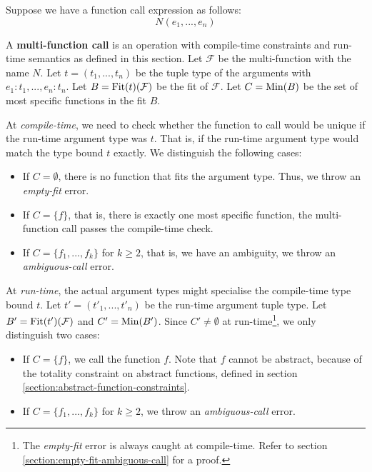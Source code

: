 \begin{definition}
	Suppose we have a function call expression as follows:
	\begin{equation*}
		N(e_1, ..., e_n)
	\end{equation*}
	
	\noindent A \textbf{multi-function call} is an operation with compile-time constraints and run-time semantics as defined in this section. Let $\mathcal{F}$ be the multi-function with the name $N$. Let $t = (t_1, ..., t_n)$ be the tuple type of the arguments with $e_1 : t_1, ..., e_n : t_n$. Let $B = \operatorname{Fit}(t)(\mathcal{F})$ be the fit of $\mathcal{F}$. Let $C = \operatorname{Min}(B)$ be the set of most specific functions in the fit $B$. 
	
	At \textit{compile-time}, we need to check whether the function to call would be unique if the run-time argument type was $t$. That is, if the run-time argument type would match the type bound $t$ exactly. We distinguish the following cases:
	\begin{itemize}
		\item If $C = \emptyset$, there is no function that fits the argument type. Thus, we throw an \textit{empty-fit} error.
		\item If $C = \{ f \}$, that is, there is exactly one most specific function, the multi-function call passes the compile-time check.
		\item If $C = \{ f_1, ..., f_k \}$ for $k \geq 2$, that is, we have an ambiguity, we throw an \textit{ambiguous-call} error.
	\end{itemize}
	
	\noindent At \textit{run-time}, the actual argument types might specialise the compile-time type bound $t$. Let $t' = (t'_1, ..., t'_n)$ be the run-time argument tuple type. Let $B' = \operatorname{Fit}(t')(\mathcal{F})$ and $C' = \operatorname{Min}(B')$. Since $C' \neq \emptyset$ at run-time\footnote{The \textit{empty-fit} error is always caught at compile-time. Refer to section \ref{section:empty-fit-ambiguous-call} for a proof.}, we only distinguish two cases:
	\begin{itemize}
		\item If $C = \{ f \}$, we call the function $f$. Note that $f$ cannot be abstract, because of the totality constraint on abstract functions, defined in section \ref{section:abstract-function-constraints}.
		\item If $C = \{ f_1, ..., f_k \}$ for $k \geq 2$, we throw an \textit{ambiguous-call} error.
	\end{itemize}
\end{definition}

